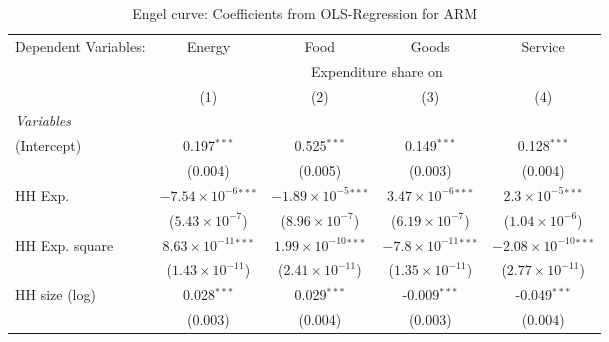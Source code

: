 
\begin{table}[htbp!]
   \centering
   \small
   \begin{adjustbox}{width = 1\textwidth, max height = 0.95\textheight, center}
      \begin{threeparttable}[b]
         \caption{\label{tab:Engel_parametric_ARM} Engel curve: Coefficients from OLS-Regression for ARM}
         \begin{tabular}{lcccc}
            \tabularnewline \midrule \midrule
            Dependent Variables: & Energy                         & Food                           & Goods                          & Service\\  
             & \multicolumn{4}{c}{Expenditure share on} \\ 
                                 & (1)                            & (2)                            & (3)                            & (4)\\  
            \midrule
            \emph{Variables}\\
            (Intercept)          & 0.197$^{***}$                  & 0.525$^{***}$                  & 0.149$^{***}$                  & 0.128$^{***}$\\   
                                 & (0.004)                        & (0.005)                        & (0.003)                        & (0.004)\\   
            HH Exp.              & $-7.54\times 10^{-6}$$^{***}$  & $-1.89\times 10^{-5}$$^{***}$  & $3.47\times 10^{-6}$$^{***}$   & $2.3\times 10^{-5}$$^{***}$\\    
                                 & ($5.43\times 10^{-7}$)         & ($8.96\times 10^{-7}$)         & ($6.19\times 10^{-7}$)         & ($1.04\times 10^{-6}$)\\    
            HH Exp. square       & $8.63\times 10^{-11}$$^{***}$  & $1.99\times 10^{-10}$$^{***}$  & $-7.8\times 10^{-11}$$^{***}$  & $-2.08\times 10^{-10}$$^{***}$\\    
                                 & ($1.43\times 10^{-11}$)        & ($2.41\times 10^{-11}$)        & ($1.35\times 10^{-11}$)        & ($2.77\times 10^{-11}$)\\    
            HH size (log)        & 0.028$^{***}$                  & 0.029$^{***}$                  & -0.009$^{***}$                 & -0.049$^{***}$\\   
                                 & (0.003)                        & (0.004)                        & (0.003)                        & (0.004)\\   

\end{tabular}
\end{threeparttable}
\end{adjustbox}
\end{table}
